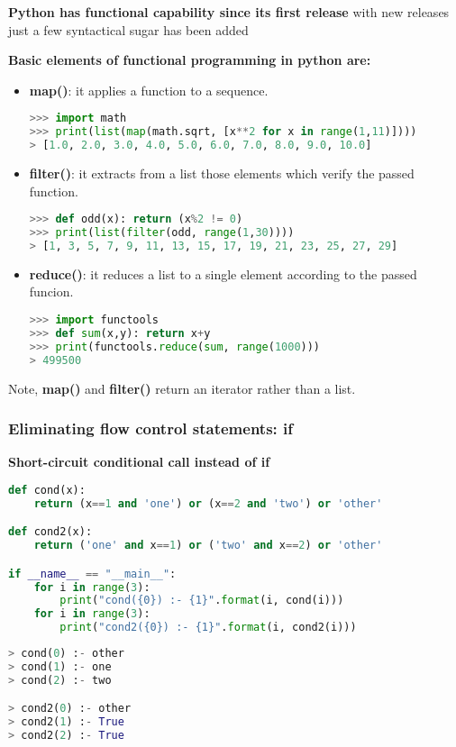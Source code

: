 \textbf{Python has functional capability since its first release}
with new  releases just a few syntactical sugar has been added

\textbf{Basic elements of functional programming in python are:}
\begin{itemize}
	\item \textbf{map()}: it applies a function to a sequence.
\begin{lstlisting}[language=Python]
>>> import math
>>> print(list(map(math.sqrt, [x**2 for x in range(1,11)])))
> [1.0, 2.0, 3.0, 4.0, 5.0, 6.0, 7.0, 8.0, 9.0, 10.0]
\end{lstlisting}
	\item \textbf{filter()}: it extracts from a list those elements which verify the passed function.
\begin{lstlisting}[language=Python]
>>> def odd(x): return (x%2 != 0)
>>> print(list(filter(odd, range(1,30))))
> [1, 3, 5, 7, 9, 11, 13, 15, 17, 19, 21, 23, 25, 27, 29]
\end{lstlisting}
\item \textbf{reduce()}: it reduces a list to a single element according to the passed funcion.
\begin{lstlisting}[language=Python]
>>> import functools
>>> def sum(x,y): return x+y
>>> print(functools.reduce(sum, range(1000)))
> 499500
\end{lstlisting}
\end{itemize}

Note, \textbf{map()} and \textbf{filter()} return an iterator rather than a list.

\subsubsection{Eliminating flow control statements: if}
\textbf{Short-circuit conditional call instead of if}
\begin{lstlisting}[language=Python]
def cond(x):
	return (x==1 and 'one') or (x==2 and 'two') or 'other'

def cond2(x):
	return ('one' and x==1) or ('two' and x==2) or 'other'

if __name__ == "__main__":
	for i in range(3):
		print("cond({0}) :- {1}".format(i, cond(i)))
	for i in range(3):
		print("cond2({0}) :- {1}".format(i, cond2(i)))
\end{lstlisting}
\begin{lstlisting}[language=Python]
> cond(0) :- other
> cond(1) :- one
> cond(2) :- two

> cond2(0) :- other
> cond2(1) :- True
> cond2(2) :- True
\end{lstlisting}


